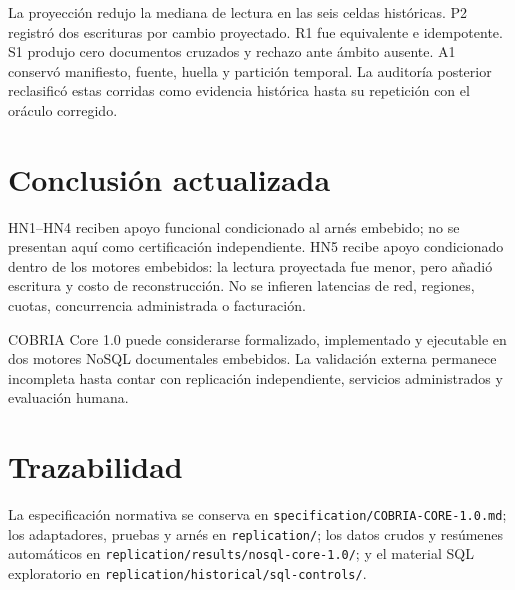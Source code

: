 \documentclass[11pt]{article}
\begin{document}
La proyección redujo la mediana de lectura en las seis celdas históricas. P2 registró dos escrituras por cambio proyectado. R1 fue equivalente e idempotente. S1 produjo cero documentos cruzados y rechazo ante ámbito ausente. A1 conservó manifiesto, fuente, huella y partición temporal. La auditoría posterior reclasificó estas corridas como evidencia histórica hasta su repetición con el oráculo corregido.

\section*{Conclusión actualizada}
HN1--HN4 reciben apoyo funcional condicionado al arnés embebido; no se presentan aquí como certificación independiente. HN5 recibe apoyo condicionado dentro de los motores embebidos: la lectura proyectada fue menor, pero añadió escritura y costo de reconstrucción. No se infieren latencias de red, regiones, cuotas, concurrencia administrada o facturación.

COBRIA Core 1.0 puede considerarse formalizado, implementado y ejecutable en dos motores NoSQL documentales embebidos. La validación externa permanece incompleta hasta contar con replicación independiente, servicios administrados y evaluación humana.

\section*{Trazabilidad}
La especificación normativa se conserva en \texttt{specification/COBRIA-CORE-1.0.md}; los adaptadores, pruebas y arnés en \texttt{replication/}; los datos crudos y resúmenes automáticos en \texttt{replication/results/nosql-core-1.0/}; y el material SQL exploratorio en \texttt{replication/historical/sql-controls/}.
\end{document}
